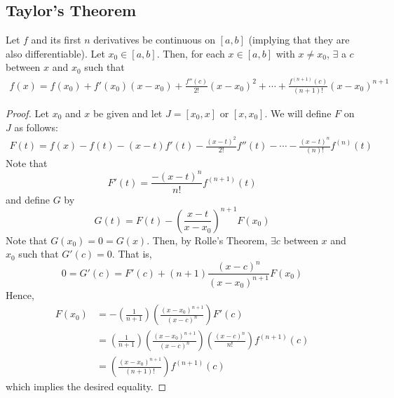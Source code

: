 \subsection{Taylor's Theorem}
\begin{theorem}
    Let $f$ and its first $n$ derivatives be continuous on $[a, b]$ (implying that they are also differentiable). Let $x_0 \in [a, b]$. Then, for each $x \in [a, b]$ with $x \neq x_0$, $\exists$ a $c$ between $x$ and $x_0$ such that
    \begin{align*}
        f(x) = f(x_0) + f'(x_0)(x - x_0) + \frac{f''(c)}{2!}(x - x_0)^2 + \cdots + \frac{f^{(n + 1)}(c)}{(n + 1)!}(x - x_0)^{n + 1}
    \end{align*}
\end{theorem}
\begin{proof}
    Let $x_0$ and $x$ be given and let $J = [x_0, x]$ or $[x, x_0]$. We will define $F$ on $J$ as follows:
    \begin{align*}
        F(t) = f(x) - f(t) - (x - t)f'(t) - \frac{(x - t)^2}{2!}f''(t) - \cdots - \frac{(x - t)^{n}}{(n)!}f^{(n)}(t)
    \end{align*}
    Note that $$F'(t) = \frac{-(x - t)^n}{n!} f^{(n + 1)} (t) $$ and define $G$ by $$G(t) = F(t) - \left(\frac{x - t}{x - x_0}\right)^{n + 1} F(x_0)$$
    Note that $G(x_0) = 0 = G(x)$. Then, by Rolle's Theorem, $\exists c$ between $x$ and $x_0$ such that $G'(c) = 0$. That is, $$0 = G'(c) = F'(c) + (n + 1) \frac{(x - c)^n}{(x - x_0)^{n + 1}} F(x_0)$$ 
    Hence, 
    \begin{align*}
        F(x_0) &= - \left(\frac{1}{n + 1}\right) \left(\frac{(x - x_0)^{n + 1}}{(x - c)^n}\right) F'(c) \\
        &= \left(\frac{1}{n + 1}\right) \left(\frac{(x - x_0)^{n + 1}}{(x - c)^n}\right) \left(\frac{(x - c)^n}{n!}\right) f^{(n + 1)} (c) \\
        &= \left(\frac{(x - x_0)^{n + 1}}{(n + 1)!}\right) f^{(n + 1)} (c)
    \end{align*}
    which implies the desired equality.
\end{proof}
